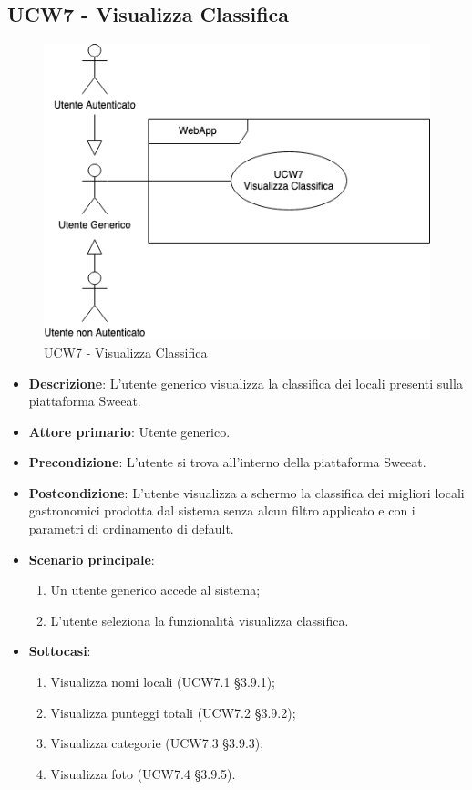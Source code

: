 \subsection{UCW7 - Visualizza Classifica}
\begin{figure}[!h]
\centering
\includegraphics[scale=0.5]{UC_images/UCW7.png}
\caption{UCW7 - Visualizza Classifica}
\end{figure}
\begin{center}
\end{center}
\begin{itemize}
	\item \textbf{Descrizione}: L'utente generico visualizza la classifica dei locali presenti sulla piattaforma Sweeat.
    \item \textbf{Attore primario}: Utente generico.
    \item \textbf{Precondizione}: L’utente si trova all’interno della piattaforma Sweeat.
    \item \textbf{Postcondizione}: L’utente visualizza a schermo la classifica dei migliori locali gastronomici prodotta dal sistema senza alcun filtro applicato e con i parametri di ordinamento di default.
    \item \textbf{Scenario principale}: 
    \begin{enumerate}
        \item Un utente generico accede al sistema;
        \item L’utente seleziona la funzionalità visualizza classifica.
    \end{enumerate}
    \item \textbf{Sottocasi}:
    \begin{enumerate}
        \item Visualizza nomi locali (UCW7.1 §3.9.1);
        \item Visualizza punteggi totali (UCW7.2 §3.9.2);
        \item Visualizza categorie (UCW7.3 §3.9.3);
        \item Visualizza foto (UCW7.4 §3.9.5).
    \end{enumerate}
\end{itemize}

